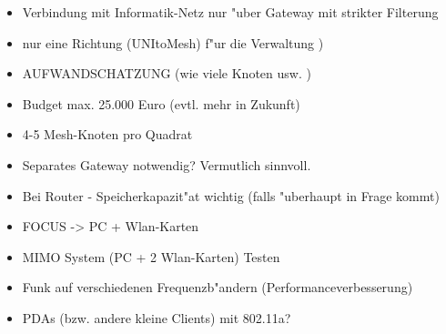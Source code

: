 \begin{itemize}
	\item Verbindung mit Informatik-Netz nur "uber Gateway
	mit strikter Filterung 

	\item nur eine Richtung (UNItoMesh) f"ur die Verwaltung ) 

	\item AUFWANDSCHATZUNG (wie viele Knoten usw. ) 

	\item Budget max. 25.000 Euro (evtl. mehr in Zukunft) 

	\item 4-5 Mesh-Knoten pro Quadrat 

	\item Separates Gateway notwendig? Vermutlich sinnvoll. 

	\item Bei Router - Speicherkapazit"at wichtig
	(falls "uberhaupt in Frage kommt) 

	\item FOCUS -> PC + Wlan-Karten

	\item MIMO System (PC + 2 Wlan-Karten) Testen

	\item Funk auf verschiedenen Frequenzb"andern (Performanceverbesserung) 

	\item PDAs (bzw. andere kleine Clients) mit 802.11a?
	
\end{itemize}


